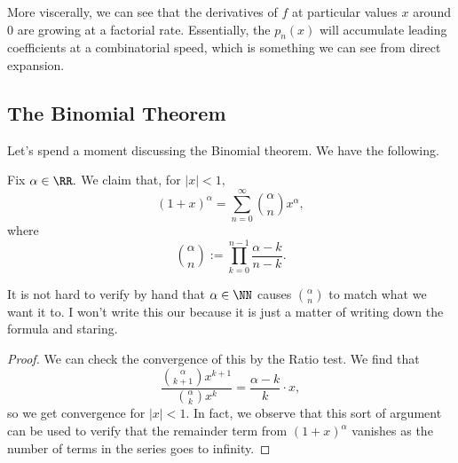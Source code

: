 \begin{remark}
	More viscerally, we can see that the derivatives of $f$ at particular values $x$ around $0$ are growing at a factorial rate. Essentially, the $p_n(x)$ will accumulate leading coefficients at a combinatorial speed, which is something we can see from direct expansion.
\end{remark}

\subsection{The Binomial Theorem}
Let's spend a moment discussing the Binomial theorem. We have the following.
\begin{proposition}
	Fix $\alpha\in\RR.$ We claim that, for $|x|<1,$
	\[(1+x)^\alpha=\sum_{n=0}^\infty\binom\alpha n x^\alpha,\]
	where
	\[\binom\alpha n:=\prod_{k=0}^{n-1}\frac{\alpha-k}{n-k}.\]
\end{proposition}
\begin{remark}
	It is not hard to verify by hand that $\alpha\in\NN$ causes $\binom\alpha n$ to match what we want it to. I won't write this our because it is just a matter of writing down the formula and staring.
\end{remark}
\begin{proof}
	We can check the convergence of this by the Ratio test. We find that
	\[\frac{\binom\alpha{k+1}x^{k+1}}{\binom\alpha kx^k}=\frac{\alpha-k}k\cdot x,\]
	so we get convergence for $|x|<1.$ In fact, we observe that this sort of argument can be used to verify that the remainder term from $(1+x)^\alpha$ vanishes as the number of terms in the series goes to infinity.
\end{proof}


